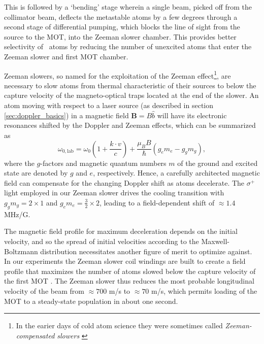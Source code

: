 	This is followed by a `bending' stage wherein a single beam, picked off from the collimator beam, deflects the metastable atoms by a few degrees through a second stage of differential pumping, which blocks the line of sight from the source to the MOT, into the Zeeman slower chamber.
	This provides better selectivity of \mhe~atoms by reducing the number of unexcited atoms that enter the Zeeman slower and first MOT chamber.

	Zeeman slowers, so named for the exploitation of the Zeeman effect\footnote{In the earier days of cold atom science they were sometimes called \emph{Zeeman-compensated slowers} \cite{Mastwijk98}}, are necessary to slow atoms from thermal characteristic of their sources to below the capture velocity of the magneto-optical traps located at the end of the slower.
	An atom moving with respect to a laser source (as described in section \ref{sec:doppler_basics}) in a magnetic field $\textbf{B} = B\hat{b}$ will have its electronic resonances shifted by the Doppler and Zeeman effects, which can be summarized as
	\begin{equation}
		\omega_{0,\text{lab}} = \omega_{0}\left(1 + \frac{k\cdot v}{c}\right) + \frac{\mu_B B}{\hbar}\left(g_e m_e - g_g m_g\right),
	\end{equation}
	where the $g$-factors and magnetic quantum numbers $m$ of the ground and excited state are denoted by $g$ and $e$, respectively. 
	Hence, a carefully architected magnetic field can compensate for the changing Doppler shift as atoms decelerate.
	The $\sigma^+$ light employed in our Zeeman slower drives the cooling transition with $g_g m_g = 2\times 1$ and $g_e m_e = \frac{3}{2}\times2$, leading to a field-dependent shift of $\approx1.4$ MHz/G.
	
	The magnetic field profile for maximum deceleration depends on the initial velocity, and so the spread of initial velocities according to the Maxwell-Boltzmann distribution necessitates another figure of merit to optimize against.
	In our experiments the Zeeman slower coil windings are built to create a field profile that maximizes the number of atoms slowed below the capture velocity of the first MOT \cite{Dedman04}.
	The Zeeman slower thus reduces the most probable longitudinal velocity of the beam from $\approx700$ m/s to $\approx70$ m/s, which permits loading of the MOT to a steady-state population in about one second.

